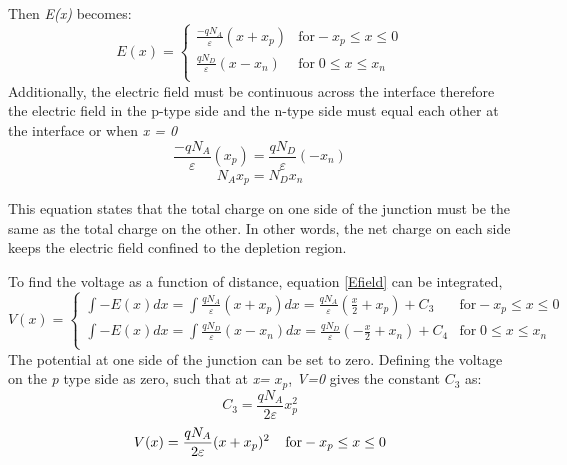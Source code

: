 \begin{doublespace}
Then \textit{E(x)} becomes:
\begin{equation}
E(x) = \begin{cases}
         \frac{-qN_{A}}{\varepsilon}(x+x_{p}) & \text{for}  -x_{p}\leq x \leq 0 \\
         \frac{qN_{D}}{\varepsilon}(x-x_{n})  &  \text{for} \; 0 \leq x \leq x_{n}  \\
     \end{cases}
\end{equation}
Additionally, the electric field must be continuous across the interface therefore the electric field in the p-type side and the n-type side must equal each other at the interface or when \textit{x = 0} 
\begin{equation}
\frac{-qN_{A}}{\varepsilon}(x_{p})=\frac{qN_{D}}{\varepsilon}(-x_{n}) \nonumber
\end{equation}
\begin{equation}
N_{A}x_{p}=N_{D}x_{n}
\label{NAeqND}
\end{equation}

This equation states that the total charge on one side of the junction must be the same as the total charge on the other. In other words, the net charge on each side keeps the electric field confined to the depletion region.

To find the voltage as a function of distance, equation \ref{Efield} can be integrated,
\begin{equation}
V(x) = \begin{cases}
       \int -E(x)dx=\int \frac{qN_{A}}{\varepsilon}(x+x_{p}) dx = \frac{qN_{A}}{\varepsilon}(\frac{x}{2}+x_{p})+ C_{3} & \text{for}  -x_{p}\leq x \leq 0 \\
       \int -E(x)dx=\int \frac{qN_{D}}{\varepsilon}(x-x_{n}) dx = \frac{qN_{D}}{\varepsilon}(-\frac{x}{2}+x_{n})+ C_{4}  &  \text{for} \; 0 \leq x \leq x_{n}  \\
     \end{cases}
\end{equation}
The potential at one side of the junction can be set to zero. Defining the voltage on the \textit{p} type side as zero, such that at \textit{x=} $x_p$, \textit{V=0} gives the constant $C_3$ as:
\begin{equation}
C_{3}=\frac{qN_{A}}{2\varepsilon}x_{p}^{2}
\end{equation}
\begin{equation}
V(x)=\frac{qN_{A}}{2\varepsilon}(x+x_{p})^{2}  \; \; \;\;  \text{for}  -x_{p}\leq x \leq 0 \\
\end{equation}


\end{doublespace}
